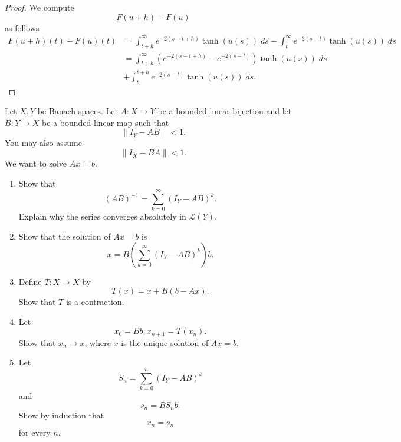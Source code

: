 \begin{proof}
    We compute 
    \[
        F(u + h) - F(u)
    \]
    as follows 
    \begin{align*}
        F(u+h)(t) - F(u)(t) 
        &= \int_{t + h}^\infty e^{-2(s-t + h)} \tanh(u(s)) \; ds 
        - \int_t^\infty e^{-2(s-t)} \tanh(u(s)) \; ds \\ 
        &= \int_{t+h}^\infty (e^{-2(s-t+h)} - e^{-2(s-t)})\tanh(u(s)) 
        \; ds \\  &+ \int_t^{t+h} e^{-2(s-t)} \tanh(u(s)) \; ds.
    \end{align*}
\end{proof}

\begin{prob}
    Let $X,Y$ be Banach spaces. Let 
    $A : X \to Y$ be a bounded linear bijection and 
    let $B : Y \to X$ be a bounded linear map such that 
    \[
        \|I_Y - AB\| < 1. 
    \]
    You may also assume 
    \[
        \|I_X - BA\| < 1. 
    \]
    We want to solve $Ax = b$.

    \begin{enumerate}[label=\alph*)]
        \item Show that 
            \[
                (AB)^{-1} = \sum_{k=0}^\infty (I_Y - AB)^k. 
            \]
            Explain why the series converges absolutely in 
            $\mathcal L(Y)$. 
        \item Show that the solution of $Ax = b$ is 
            \[
                x = B\left(\sum_{k=0}^\infty (I_Y - AB)^k\right)b.
            \]
        \item Define $T : X \to X$ by 
            \[
                T(x) = x + B(b-Ax). 
            \]
            Show that $T$ is a contraction. 
        \item Let 
            \[
                x_0 = Bb, x_{n+1} = T(x_n). 
            \]
            Show that $x_n \to x$, where $x$ is the unique 
            solution of $Ax = b$. 
        \item Let 
            \[
                S_n = \sum_{k=0}^n (I_Y - AB)^k
            \]
            and 
            \[
                s_n = BS_nb. 
            \]
            Show by induction that 
            \[
                x_n = s_n
            \]
            for every $n$. 
    \end{enumerate}
\end{prob}

